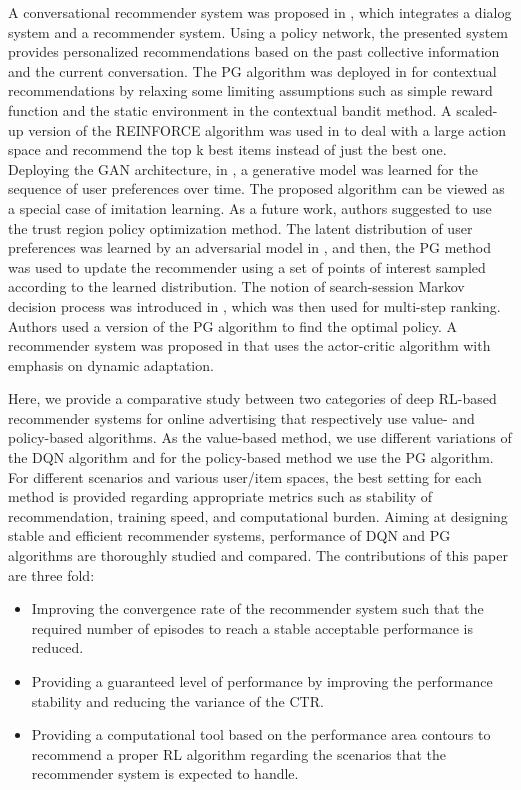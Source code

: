 \documentclass[journal]{IEEEtran}
\begin{document}
A conversational recommender system was proposed in \cite{sun2018conversational}, which integrates a dialog system and a recommender system. Using a policy network, the presented system provides personalized recommendations based on the past collective information and the current conversation. The PG algorithm was deployed in \cite{pan2019policy} for contextual recommendations by relaxing some limiting assumptions such as simple reward function and the static environment in the contextual bandit method. A scaled-up version of the REINFORCE algorithm was used in \cite{chen2019top} to deal with a large action space and recommend the top k best items instead of just the best one. Deploying the GAN architecture, in \cite{yoo2017energy}, a generative model was learned for the sequence of user preferences over time. The proposed algorithm can be viewed as a special case of imitation learning. As a future work, authors suggested to use the trust region policy optimization method. The latent distribution of user preferences was learned by an adversarial model in \cite{zhou2019adversarial}, and then, the PG method was used to update the recommender using a set of points of interest sampled according to the learned distribution. The notion of search-session Markov decision process was introduced in \cite{hu2018reinforcement}, which was then used for multi-step ranking. Authors used a version of the PG algorithm to find the optimal policy. A recommender system was proposed in \cite{liu2018deep} that uses the actor-critic algorithm with emphasis on dynamic adaptation.

Here, we provide a comparative study between two categories of deep RL-based recommender systems for online advertising that respectively use value- and policy-based algorithms. As the value-based method, we use different variations of the DQN algorithm and for the policy-based method we use the PG algorithm. For different scenarios and various user/item spaces, the best setting for each method is provided regarding appropriate metrics such as stability of recommendation, training speed, and computational burden. Aiming at designing stable and efficient recommender systems, performance of DQN and PG algorithms are thoroughly studied and compared. The contributions of this paper are three fold:
\begin{itemize}
\item Improving the convergence rate of the recommender system such that the required number of episodes to reach a stable acceptable performance is reduced. 
\item Providing a guaranteed level of performance by improving the performance stability and reducing the variance of the CTR.
\item Providing a computational tool based on the performance area contours to recommend a proper RL algorithm regarding the scenarios that the recommender system is expected to handle.
\end{itemize}
\end{document}
